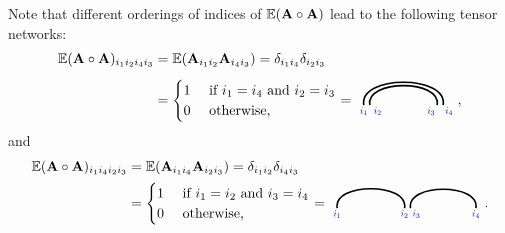\begin{remark}
    Note that different orderings of indices of $\mathbb{E}(\mathbf{A}\circ\mathbf{A})$ lead to the following tensor networks:  
    \begin{align*}
            \EE(\Ab\outprod\Ab)_{i_1i_2i_4i_3}
            &= 
            \EE(\Ab_{i_1i_2}\Ab_{i_4i_3}) 
    = \delta_{i_1i_4}\delta_{i_2i_3}\\
    &=
    \begin{cases}
        1 & \text{ if } i_1=i_4\text{ and } i_2=i_3\\
        0 & \text{ otherwise, }
    \end{cases} 
    =
    \begin{tikzpicture}[baseline=\baseline]
    \tikzset{tensor/.style = {minimum size = 0.5cm,shape = circle,thick,draw=black,inner sep = 0pt}, edge/.style = {thick,line width=.4mm},every loop/.style={}}
    \def\y{0}
    \def\x{0}
    \draw[edge] (\x,\y-0.1) to [out=100,in=80] (\x+2,\y-0.1);
    \draw[edge] (\x+0.15,\y-0.1) to [out=100,in=80] (\x+1.85,\y-0.1);
    \node[draw=none] () at (\x,\y-0.25) {\scalebox{0.7}{\indcolor{$i_1$}}};
    \node[draw=none] () at (\x+2.15,\y-0.25) {\scalebox{0.7}{\indcolor{$i_4$}}};
    \node[draw=none] () at (\x+0.35,\y-0.25) {\scalebox{0.7}{\indcolor{$i_2$}}};
    \node[draw=none] () at (\x+1.7,\y-0.25) {\scalebox{0.7}{\indcolor{$i_3$}}};
\end{tikzpicture},
    \end{align*}
and
\begin{align*}
\EE(\Ab\outprod\Ab)_{i_1i_4i_2i_3} 
&= 
\EE(\Ab_{i_1i_4}\Ab_{i_2i_3})= \delta_{i_1i_2}\delta_{i_4i_3}\\
&=
\begin{cases}
        1 & \text{ if } i_1=i_2\text{ and } i_3=i_4\\
        0 & \text{ otherwise, }
\end{cases}
=
\begin{tikzpicture}[baseline=\baseline]
    \tikzset{tensor/.style = {minimum size = 0.5cm,shape = circle,thick,draw=black,inner sep = 0pt}, edge/.style = {thick,line width=.4mm},every loop/.style={}}
    \def\y{0}
    \def\x{0}
    \draw[edge] (\x+0.15,\y-0.1) to [out=100,in=80] (\x+1.85,\y-0.1);
    \draw[edge] (\x+2,\y-0.1) to [out=100,in=80] (\x+3.65,\y-0.1);
    \node[draw=none] () at (\x+0.15,\y-0.25) {\scalebox{0.7}{\indcolor{$i_1$}}};
    \node[draw=none] () at (\x+1.85,\y-0.25) {\scalebox{0.7}{\indcolor{$i_2$}}};
    \node[draw=none] () at (\x+2.15,\y-0.25) {\scalebox{0.7}{\indcolor{$i_3$}}};
    \node[draw=none] () at (\x+3.65,\y-0.25) {\scalebox{0.7}{\indcolor{$i_4$}}};
\end{tikzpicture}.
\end{align*}
\end{remark}
